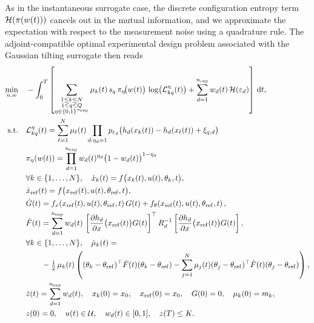 \documentclass[a4paper,11pt]{article}
\begin{document}
As in the instantaneous surrogate case, the discrete configuration entropy term \({\cal H}(\pi(w(t)))\) cancels out in the mutual information, and we approximate the expectation with respect to the measurement noise
using a quadrature rule. 
The adjoint-compatible optimal experimental design problem associated with the Gaussian tilting surrogate then reads
\begin{equation}
\begin{aligned}
\min_{u, w} \quad & -
\int_0^T \left[
\sum_{\substack{1\le k\le N\\ 1\le q\le Q\\ \eta\in\{0,1\}^{n_{\mathrm{exp}}}}}
\mu_k(t)\, s_q\,
\pi_\eta\!\big(w(t)\big)
\,
\log\!\big(\mathcal L_{kq}^{\eta}(t)\big)
+ \sum_{d=1}^{n_{\mathrm{exp}}} w_{d}(t)\, {\cal H}(\varepsilon_d)\right]\,\mathrm{d}t , \\
\text{s.t.} \quad
& \mathcal L_{kq}^\eta(t)
=
\sum_{\ell=1}^N
\mu_\ell(t)
\prod\limits_{d:\eta_d = 1}
p_{\varepsilon_d}\big(
h_d(x_k(t))-
h_d(x_\ell(t))+
\xi_{q,d}
\big)\\
& \pi_\eta(w(t))
=
\prod_{d=1}^{n_{\mathrm{exp}}}
w_d(t)^{\eta_d}
\bigl(1-w_d(t)\bigr)^{1-\eta_d} \\
&\forall k \in \{1,\dots,N\}, \quad \dot{x}_k(t) = f\bigl(x_k(t), u(t), \theta_k, t\bigr), \\
&\dot{x}_{\mathrm{ref}}(t) = f\bigl(x_{\mathrm{ref}}(t), u(t), \theta_{\mathrm{ref}}, t\bigr), \\
& \dot G(t)
= f_x\!\left(x_\mathrm{ref}(t),u(t),\theta_\mathrm{ref}, t\right) G(t)
+ f_\theta\!\left(x_\mathrm{ref}(t),u(t),\theta_\mathrm{ref}, t\right),\\
& \dot{F}(t) = \sum_{d=1}^{n_{\mathrm{exp}}}
w_d(t)\, \left[\frac{\partial h_d}{\partial x}\bigl(x_\mathrm{ref}(t)\bigr) G(t)\right]^\top
R_d^{-1}
\left[\frac{\partial h_d}{\partial x}\bigl(x_\mathrm{ref}(t)\bigr) G(t)\right], \\
& \forall k \in \{1,\dots,N\}, \quad \dot \mu_k(t)
= \\
&\quad \quad -\tfrac12\,\mu_k(t)
\left(
(\theta_k-\theta_\mathrm{ref})^\top \dot{F}(t)(\theta_k-\theta_\mathrm{ref})
-
\sum_{j=1}^N \mu_j(t)
(\theta_j-\theta_\mathrm{ref})^\top \dot{F}(t)(\theta_j-\theta_\mathrm{ref})
\right), \\
& \dot{z}(t) = \sum_{d=1}^{n_{\mathrm{exp}}}w_d(t), \quad
x_k(0)=x_0,\quad x_{\mathrm{ref}}(0)=x_0, \quad G(0)=0,\quad \mu_k(0)=m_k,\\ &z(0)=0, \quad
u(t) \in \mathcal{U}, \quad w_d(t) \in [0,1], \quad z(T) \le K.
\end{aligned} \label{eq:optimisation_prbl_tilt}
\end{equation}
\end{document}

